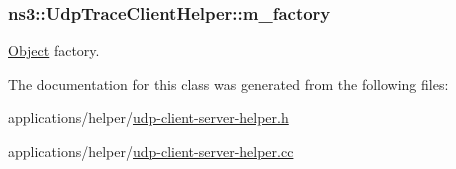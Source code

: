 \subsubsection[{\texorpdfstring{m\+\_\+factory}{m_factory}}]{ ns3\+::\+Udp\+Trace\+Client\+Helper\+::m\+\_\+factory\hspace{0.3cm}{\ttfamily [private]}}\hypertarget{classns3_1_1UdpTraceClientHelper_ae1012eb555c375f423a00a3ae0db826b}{}\label{classns3_1_1UdpTraceClientHelper_ae1012eb555c375f423a00a3ae0db826b}


\hyperlink{classns3_1_1Object}{Object} factory. 



The documentation for this class was generated from the following files\+:\begin{DoxyCompactItemize}
\item 
applications/helper/\hyperlink{udp-client-server-helper_8h}{udp-\/client-\/server-\/helper.\+h}\item 
applications/helper/\hyperlink{udp-client-server-helper_8cc}{udp-\/client-\/server-\/helper.\+cc}\end{DoxyCompactItemize}
